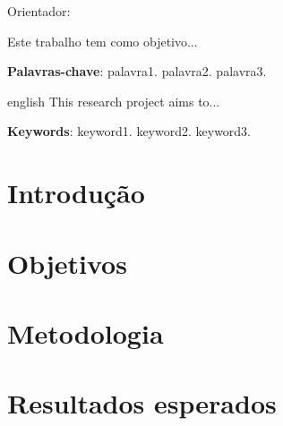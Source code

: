 \documentclass[12pt,openright,oneside,a4paper,chapter=TITLE]{abntex2}
\begin{document}
\begin{titlingpage}
  \centering
  \vspace*{1cm}
  {\large\MakeUppercase\imprimirautor}
  \par
  \vspace*{\fill}\vspace*{\fill}
  {\ABNTEXchapterfont\Large\MakeUppercase{\imprimirtitulo}}
  \par
  \vspace*{\fill}
  {\large{Orientador: }\imprimirorientador}
  \par
  \vspace*{\fill}
  \vspace*{2cm}
  {\large\imprimirlocal}
  \par
  {\large\imprimirdata}
  \vspace*{\fill}
\end{titlingpage}

\begin{resumo}
  Este trabalho tem como objetivo...
  
  \vspace{\onelineskip}
  
  \noindent
  \textbf{Palavras-chave}: palavra1. palavra2. palavra3.
\end{resumo}

\renewcommand{\resumoname}{Abstract}
\begin{resumo}[Abstract]
  \begin{otherlanguage*}{english}
    This research project aims to...
    
    \vspace{\onelineskip}
    
    \noindent
    \textbf{Keywords}: keyword1. keyword2. keyword3.
  \end{otherlanguage*}
\end{resumo}

\tableofcontents* %

\chapter{Introdução}
\textual %


\chapter{Objetivos}


\chapter{Metodologia}


\chapter{Resultados esperados}


\end{document}
